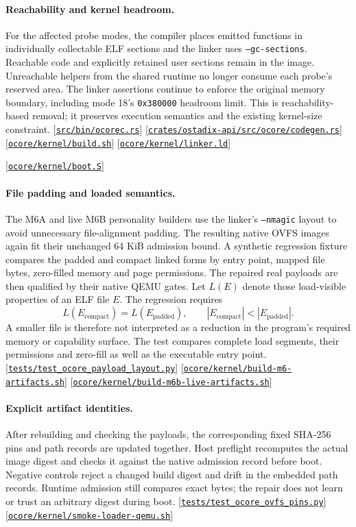 \documentclass[11pt,oneside]{article}
\newcommand{\src}[1]{\textcolor{OSlate}{\scriptsize[\href{https://github.com/lostadi/OSTADIX/blob/c0b02c326b2329a95ba52447c7180bc93957cd57/#1}{\nolinkurl{#1}}]}\allowbreak}
\begin{document}
\paragraph{Reachability and kernel headroom.}
For the affected probe modes, the compiler places emitted functions in
individually collectable ELF sections and the linker uses
\texttt{--gc-sections}. Reachable code and explicitly retained user sections
remain in the image. Unreachable helpers from the shared runtime no longer
consume each probe's reserved area. The linker assertions continue to enforce
the original memory boundary, including mode 18's \texttt{0x380000}
headroom limit. This is reachability-based removal; it preserves execution
semantics and the existing kernel-size constraint.
\src{src/bin/ocorec.rs}
\src{crates/ostadix-api/src/ocore/codegen.rs}
\src{ocore/kernel/build.sh}
\src{ocore/kernel/linker.ld}

\src{ocore/kernel/boot.S}

\paragraph{File padding and loaded semantics.}
The M6A and live M6B personality builders use the linker's \texttt{--nmagic}
layout to avoid unnecessary file-alignment padding. The resulting native
OVFS images again fit their unchanged 64 KiB admission bound. A synthetic regression fixture compares the padded and compact linked
forms by entry point, mapped file bytes, zero-filled memory and page
permissions. The repaired real payloads are then qualified by their native
QEMU gates. Let $L(E)$ denote those load-visible properties of an
ELF file $E$. The regression requires
\[
 L(E_{\mathrm{compact}})=L(E_{\mathrm{padded}}),
 \qquad |E_{\mathrm{compact}}|<|E_{\mathrm{padded}}|.
\]
A smaller file is therefore not interpreted as a reduction in the program's
required memory or capability surface. The test compares complete load segments, their permissions and zero-fill
as well as the executable entry point.
\src{tests/test_ocore_payload_layout.py}
\src{ocore/kernel/build-m6-artifacts.sh}
\src{ocore/kernel/build-m6b-live-artifacts.sh}

\paragraph{Explicit artifact identities.}
After rebuilding and checking the payloads, the corresponding fixed SHA-256
pins and path records are updated together. Host preflight recomputes the
actual image digest and checks it against the native admission record before
boot. Negative controls reject a changed build digest and drift in the
embedded path records. Runtime admission still compares exact bytes; the
repair does not learn or trust an arbitrary digest during boot.
\src{tests/test_ocore_ovfs_pins.py}
\src{ocore/kernel/smoke-loader-qemu.sh}
\end{document}
